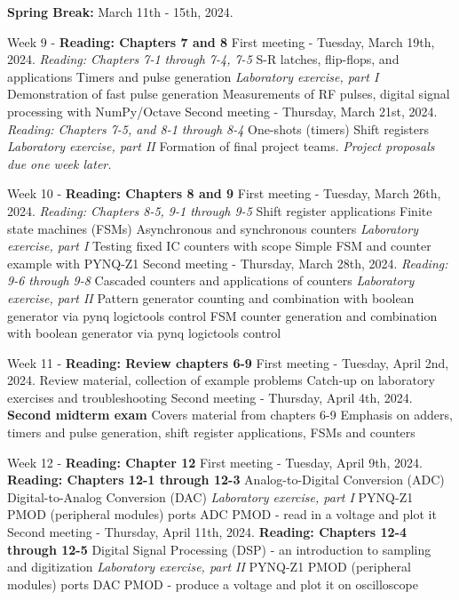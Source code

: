 \documentclass[10pt]{article}
\begin{document}
\begin{outline}[enumerate]
\1 \textbf{Spring Break:} March 11th - 15th, 2024.

\1 Week 9 - \textbf{Reading: Chapters 7 and 8}
\2 First meeting - Tuesday, March 19th, 2024. \textit{Reading: Chapters 7-1 through 7-4, 7-5}
\3 S-R latches, flip-flops, and applications
\3 Timers and pulse generation
\3 \textit{Laboratory exercise, part I}
\4 Demonstration of fast pulse generation
\4 Measurements of RF pulses, digital signal processing with NumPy/Octave
\2 Second meeting - Thursday, March 21st, 2024. \textit{Reading: Chapters 7-5, and 8-1 through 8-4}
\3 One-shots (timers)
\3 Shift registers
\3 \textit{Laboratory exercise, part II}
\4 Formation of final project teams.  \textit{Project proposals due one week later.}

\1 Week 10 - \textbf{Reading: Chapters 8 and 9}
\2 First meeting - Tuesday, March 26th, 2024. \textit{Reading: Chapters 8-5, 9-1 through 9-5}
\3 Shift register applications
\3 Finite state machines (FSMs)
\3 Asynchronous and synchronous counters
\3 \textit{Laboratory exercise, part I}
\4 Testing fixed IC counters with scope
\4 Simple FSM and counter example with PYNQ-Z1
\2 Second meeting - Thursday, March 28th, 2024. \textit{Reading: 9-6 through 9-8}
\3 Cascaded counters and applications of counters
\3 \textit{Laboratory exercise, part II}
\4 Pattern generator counting and combination with boolean generator via pynq logictools control
\4 FSM counter generation and combination with boolean generator via pynq logictools control

\1 Week 11 - \textbf{Reading: Review chapters 6-9}
\2 First meeting - Tuesday, April 2nd, 2024.
\3 Review material, collection of example problems
\3 Catch-up on laboratory exercises and troubleshooting
\2 Second meeting - Thursday, April 4th, 2024.
\3 \textbf{Second midterm exam}
\4 Covers material from chapters 6-9
\4 Emphasis on adders, timers and pulse generation, shift register applications, FSMs and counters

\1 Week 12 - \textbf{Reading: Chapter 12}
\2 First meeting - Tuesday, April 9th, 2024. \textbf{Reading: Chapters 12-1 through 12-3}
\3 Analog-to-Digital Conversion (ADC)
\3 Digital-to-Analog Conversion (DAC)
\3 \textit{Laboratory exercise, part I}
\4 PYNQ-Z1 PMOD (peripheral modules) ports
\4 ADC PMOD - read in a voltage and plot it
\2 Second meeting - Thursday, April 11th, 2024. \textbf{Reading: Chapters 12-4 through 12-5}
\3 Digital Signal Processing (DSP) - an introduction to sampling and digitization
\3 \textit{Laboratory exercise, part II}
\4 PYNQ-Z1 PMOD (peripheral modules) ports
\4 DAC PMOD - produce a voltage and plot it on oscilloscope


\end{outline}
\end{document}
